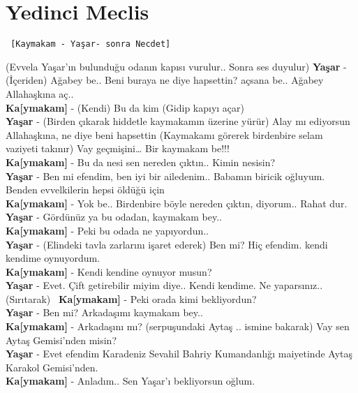 \documentclass[]{book}
\begin{document}
\hypertarget{yedinci-meclis-2}{%
\section{Yedinci Meclis}\label{yedinci-meclis-2}}

\begin{verbatim}
 [Kaymakam - Yaşar- sonra Necdet]
\end{verbatim}

(Evvela Yaşar'ın bulunduğu odanın kapısı vurulur.. Sonra ses duyulur)
\textbf{Yaşar} - (İçeriden) Ağabey be.. Beni buraya ne diye hapsettin? açsana be.. Ağabey Allahaşkına aç..\\
\textbf{Ka{[}ymakam{]}} - (Kendi) Bu da kim (Gidip kapıyı açar)\\
\textbf{Yaşar} - (Birden çıkarak hiddetle kaymakamın üzerine yürür) Alay mı ediyorsun Allahaşkına, ne diye beni hapsettin (Kaymakamı görerek birdenbire selam vaziyeti takınır) Vay geçmişini\ldots{} Bir kaymakam be!!!\\
\textbf{Ka{[}ymakam{]}} - Bu da nesi sen nereden çıktın.. Kimin nesisin?\\
\textbf{Yaşar} - Ben mi efendim, ben iyi bir ailedenim.. Babamın biricik oğluyum. Benden evvelkilerin hepsi öldüğü için\\
\textbf{Ka{[}ymakam{]}} - Yok be.. Birdenbire böyle nereden çıktın, diyorum.. Rahat dur.\\
\textbf{Yaşar} - Gördünüz ya bu odadan, kaymakam bey..\\
\textbf{Ka{[}ymakam{]}} - Peki bu odada ne yapıyordun..\\
\textbf{Yaşar} - (Elindeki tavla zarlarını işaret ederek) Ben mi? Hiç efendim. kendi kendime oynuyordum.\\
\textbf{Ka{[}ymakam{]}} - Kendi kendine oynuyor musun?\\
\textbf{Yaşar} - Evet. Çift getirebilir miyim diye.. Kendi kendime. Ne yaparsınız.. (Sırıtarak)~
\textbf{Ka{[}ymakam{]}} - Peki orada kimi bekliyordun?\\
\textbf{Yaşar} - Ben mi? Arkadaşımı kaymakam bey..\\
\textbf{Ka{[}ymakam{]}} - Arkadaşını mı? (serpuşundaki Aytaş .. ismine bakarak) Vay sen Aytaş Gemisi'nden misin?\\
\textbf{Yaşar} - Evet efendim Karadeniz Sevahil Bahriy Kumandanlığı maiyetinde Aytaş Karakol Gemisi'nden.\\
\textbf{Ka{[}ymakam{]}} - Anladım.. Sen Yaşar'ı bekliyorsun oğlum.\\
\end{document}
